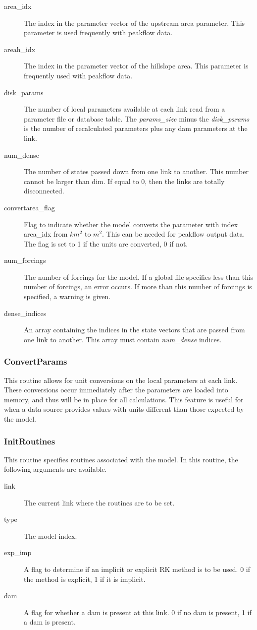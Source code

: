 \documentclass[12pt]{article}
\begin{document}
\begin{description}
 \item[area\_idx] The index in the parameter vector of the upstream area parameter. This parameter is used frequently with peakflow data.
 \item[areah\_idx] The index in the parameter vector of the hillslope area. This parameter is frequently used with peakflow data.
 \item[disk\_params] The number of local parameters available at each link read from a parameter file or database table. The \emph{params\_size} minus the \emph{disk\_params} is the number of recalculated parameters plus any dam parameters at the link.
 \item[num\_dense] The number of states passed down from one link to another. This number cannot be larger than dim. If equal to 0, then the links are totally disconnected.
 \item[convertarea\_flag] Flag to indicate whether the model converts the parameter with index area\_idx from $km^2$ to $m^2$. This can be needed for peakflow output data. The flag is set to 1 if the units are converted, 0 if not.
 \item[num\_forcings] The number of forcings for the model. If a global file specifies less than this number of forcings, an error occurs. If more than this number of forcings is specified, a warning is given.
 \item[dense\_indices] An array containing the indices in the state vectors that are passed from one link to another. This array must contain \emph{num\_dense} indices.
\end{description}

\subsubsection{ConvertParams} \label{sec: convertparams}

This routine allows for unit conversions on the local parameters at each link. These conversions occur immediately after the parameters are loaded into memory, and thus will be in place for all calculations. This feature is useful for when a data source provides values with units different than those expected by the model.

\subsubsection{InitRoutines} \label{sec: initroutines}

This routine specifies routines associated with the model. In this routine, the following arguments are available.
\begin{description}
 \item[link] The current link where the routines are to be set.
 \item[type] The model index.
 \item[exp\_imp] A flag to determine if an implicit or explicit RK method is to be used. 0 if the method is explicit, 1 if it is implicit.
 \item[dam] A flag for whether a dam is present at this link. 0 if no dam is present, 1 if a dam is present.
\end{description}
\end{document}
